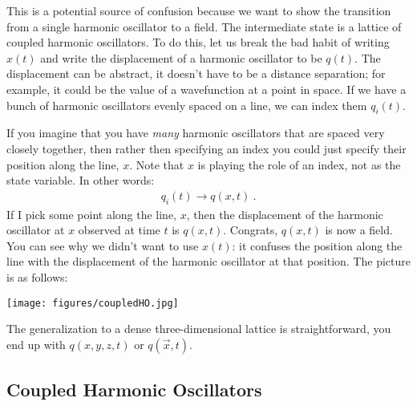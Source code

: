 This is a potential source of confusion because we want to show the transition from a single harmonic oscillator to a field. The intermediate state is a lattice of coupled harmonic oscillators. To do this, let us break the bad habit of writing $x(t)$ and write the displacement of a harmonic oscillator to be $q(t)$. The displacement can be abstract, it doesn't have to be a distance separation; for example, it could be the value of a wavefunction at a point in space. If we have a bunch of harmonic oscillators evenly spaced on a line, we can index them $q_i(t)$. 

If you imagine that you have \emph{many} harmonic oscillators that are spaced very closely together, then rather then specifying an index you could just specify their position along the line, $x$. Note that $x$ is playing the role of an index, not as the state variable. In other words:
\begin{align}
	q_i(t) \to q(x,t) \ .
\end{align}
If I pick some point along the line, $x$, then the displacement of the harmonic oscillator at $x$ observed at time $t$ is $q(x,t)$. Congrats, $q(x,t)$ is now a field. You can see why we didn't want to use $x(t)$: it confuses the position along the line with the displacement of the harmonic oscillator at that position. 
%
The picture is as follows:
\begin{center}
\texttt{[image: figures/coupledHO.jpg]}
\end{center}
The generalization to a dense three-dimensional lattice is straightforward, you end up with $q(x,y,z,t)$ or $q(\vec{x},t)$.


\subsection{Coupled Harmonic Oscillators}
\label{sec:CHO}


